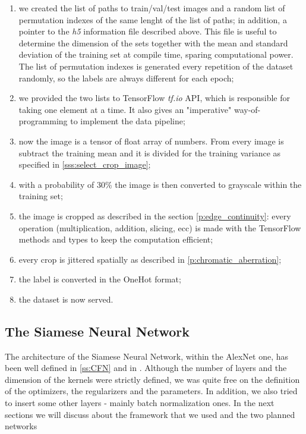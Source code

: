 \begin{enumerate}
    \item we created the list of paths to train/val/test images and a random list of permutation indexes of the same lenght of the list of paths; in addition, a pointer to the \emph{h5} information file described above. This file is useful to determine the dimension of the sets together with the mean and standard deviation of the training set at compile time, sparing computational power. The list of permutation indexes is generated every repetition of the dataset randomly, so the labels are always different for each epoch;
    \item we provided the two lists to TensorFlow \emph{tf.io} API, which is responsible for taking one element at a time. It also gives an "imperative" way-of-programming to implement the data pipeline;
    \item now the image is a tensor of float array of numbers. From every image is subtract the training mean and it is divided for the training variance as specified in \ref{sss:select_crop_image};
    \item with a probability of 30\% the image is then converted to grayscale within the training set;
    \item the image is cropped as described in the section \ref{p:edge_continuity}: every operation (multiplication, addition, slicing, ecc) is made with the TensorFlow methods and types to keep the computation efficient;
    \item every crop is jittered spatially as described in \ref{p:chromatic_aberration};
    \item the label is converted in the OneHot format;
    \item the dataset is now served.
\end{enumerate}


\subsection{The Siamese Neural Network}\label{ss:siamese}
The architecture of the Siamese Neural Network, within the AlexNet one, has been well defined in \ref{ss:CFN} and in \cite{alexnet_paper}. Although the number of layers and the dimension of the kernels were strictly defined, we was quite free on the definition of the optimizers, the regularizers and the parameters. In addition, we also tried to insert some other layers - mainly batch normalization ones. In the next sections we will discuss about the framework that we used and the two planned networks

